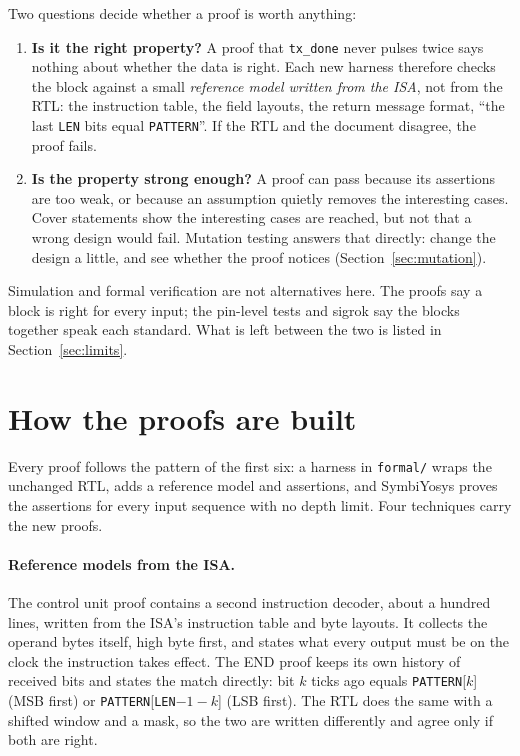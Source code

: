 \documentclass[11pt,a4paper]{article}
\newcommand{\sig}[1]{\texttt{#1}}
\begin{document}
Two questions decide whether a proof is worth anything:
\begin{enumerate}
\item \textbf{Is it the right property?} A proof that \sig{tx\_done} never pulses twice says nothing about whether the data is right. Each new harness therefore checks the block against a small \emph{reference model written from the ISA}, not from the RTL: the instruction table, the field layouts, the return message format, ``the last \sig{LEN} bits equal \sig{PATTERN}''. If the RTL and the document disagree, the proof fails.
\item \textbf{Is the property strong enough?} A proof can pass because its assertions are too weak, or because an assumption quietly removes the interesting cases. Cover statements show the interesting cases are reached, but not that a wrong design would fail. Mutation testing answers that directly: change the design a little, and see whether the proof notices (Section~\ref{sec:mutation}).
\end{enumerate}

Simulation and formal verification are not alternatives here. The proofs say a block is right for every input; the pin-level tests and sigrok say the blocks together speak each standard. What is left between the two is listed in Section~\ref{sec:limits}.

\section{How the proofs are built}\label{sec:method}

Every proof follows the pattern of the first six: a harness in \sig{formal/} wraps the unchanged RTL, adds a reference model and assertions, and SymbiYosys proves the assertions for every input sequence with no depth limit. Four techniques carry the new proofs.

\paragraph{Reference models from the ISA.} The control unit proof contains a second instruction decoder, about a hundred lines, written from the ISA's instruction table and byte layouts. It collects the operand bytes itself, high byte first, and states what every output must be on the clock the instruction takes effect. The END proof keeps its own history of received bits and states the match directly: bit $k$ ticks ago equals \sig{PATTERN}[$k$] (MSB first) or \sig{PATTERN}[\sig{LEN}$-1-k$] (LSB first). The RTL does the same with a shifted window and a mask, so the two are written differently and agree only if both are right.
\end{document}
